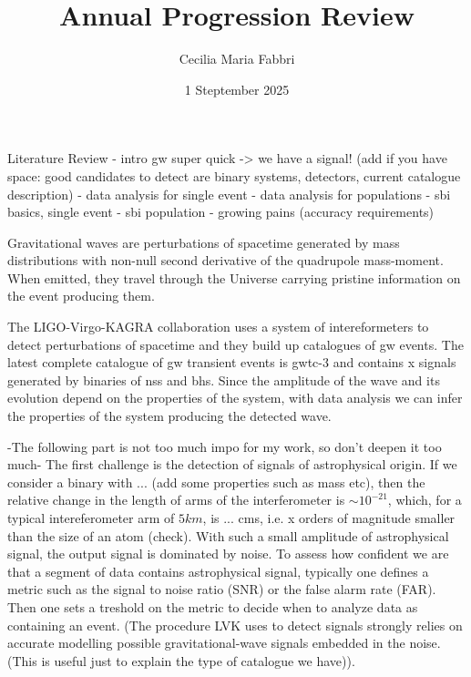 \documentclass[a4paper, 12pt, twoside, openright, titlepage]{book}
\title{Annual Progression Review}
\author{Cecilia Maria Fabbri}
\date{1 Steptember 2025}
\begin{document}


\maketitle



\frontmatter

\tableofcontents




\begin{chapter}{Literature Review}
- intro gw super quick -> we have a signal! (add if you have space: good candidates to detect are binary systems, detectors, current catalogue description)
- data analysis for single event
- data analysis for populations
- sbi basics, single event
- sbi population
- growing pains (accuracy requirements)


Gravitational waves are perturbations of spacetime generated by mass distributions with non-null second derivative of the quadrupole mass-moment. 
When emitted, they travel through the Universe carrying pristine information on the event producing them.

The LIGO-Virgo-KAGRA collaboration uses a system of intereformeters to detect perturbations of spacetime and they build up catalogues of gw events.
The latest complete catalogue of gw transient events is gwtc-3 and contains x signals generated by binaries of nss and bhs.
Since the amplitude of the wave and its evolution depend on the properties of the system, with data analysis we can infer the properties of the system producing the detected wave.

-The following part is not too much impo for my work, so don't deepen it too much-
The first challenge is the detection of signals of astrophysical origin. 
If we consider a binary with ... (add some properties such as mass etc), then the relative change in the length of arms of the interferometer is $\sim 10^{-21}$, which, for a typical intereferometer arm of $5 km$, is ... cms, i.e. x orders of magnitude smaller than the size of an atom (check).
With such a small amplitude of astrophysical signal, the output signal is dominated by noise. 
To assess how confident we are that a segment of data contains astrophysical signal, typically one defines a metric such as the signal to noise ratio (SNR) or the false alarm rate (FAR). 
Then one sets a treshold on the metric to decide when to analyze data as containing an event.
(The procedure LVK uses to detect signals strongly relies on accurate modelling possible gravitational-wave signals embedded in the noise. 
(This is useful just to explain the type of catalogue we have)).



\end{chapter}
\end{document}
